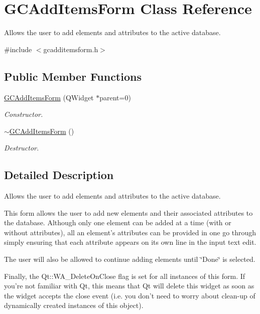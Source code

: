 \hypertarget{class_g_c_add_items_form}{\section{\-G\-C\-Add\-Items\-Form \-Class \-Reference}
\label{class_g_c_add_items_form}
}


\-Allows the user to add elements and attributes to the active database.  




{\ttfamily \#include $<$gcadditemsform.\-h$>$}

\subsection*{\-Public \-Member \-Functions}
\begin{DoxyCompactItemize}
\item 
\hyperlink{class_g_c_add_items_form_adfd8359e3e47a03741efee4e2be3d229}{\-G\-C\-Add\-Items\-Form} (\-Q\-Widget $\ast$parent=0)
\begin{DoxyCompactList}\small\item\em \-Constructor. \end{DoxyCompactList}\item 
\hyperlink{class_g_c_add_items_form_adbcd4fa77a2c1c345fd08e2333a45102}{$\sim$\-G\-C\-Add\-Items\-Form} ()
\begin{DoxyCompactList}\small\item\em \-Destructor. \end{DoxyCompactList}\end{DoxyCompactItemize}


\subsection{\-Detailed \-Description}
\-Allows the user to add elements and attributes to the active database. 

\-This form allows the user to add new elements and their associated attributes to the database. \-Although only one element can be added at a time (with or without attributes), all an element's attributes can be provided in one go through simply ensuring that each attribute appears on its own line in the input text edit.

\-The user will also be allowed to continue adding elements until \char`\"{}\-Done\char`\"{} is selected.

\-Finally, the \-Qt\-::\-W\-A\-\_\-\-Delete\-On\-Close flag is set for all instances of this form. \-If you're not familiar with \-Qt, this means that \-Qt will delete this widget as soon as the widget accepts the close event (i.\-e. you don't need to worry about clean-\/up of dynamically created instances of this object). 

